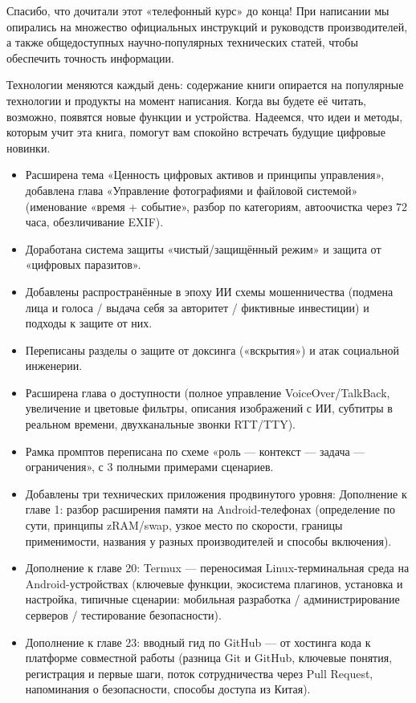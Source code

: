 
Спасибо, что дочитали этот «телефонный курс» до конца! При написании мы опирались на множество официальных инструкций и руководств производителей, а также общедоступных научно-популярных технических статей, чтобы обеспечить точность информации.

Технологии меняются каждый день: содержание книги опирается на популярные технологии и продукты на момент написания. Когда вы будете её читать, возможно, появятся новые функции и устройства. Надеемся, что идеи и методы, которым учит эта книга, помогут вам спокойно встречать будущие цифровые новинки.


\begin{itemize}
  \item Расширена тема «Ценность цифровых активов и принципы управления», добавлена глава «Управление фотографиями и файловой системой» (именование «время + событие», разбор по категориям, автоочистка через 72 часа, обезличивание EXIF).
  \item Доработана система защиты «чистый/защищённый режим» и защита от «цифровых паразитов».
  \item Добавлены распространённые в эпоху ИИ схемы мошенничества (подмена лица и голоса / выдача себя за авторитет / фиктивные инвестиции) и подходы к защите от них.
  \item Переписаны разделы о защите от доксинга («вскрытия») и атак социальной инженерии.
  \item Расширена глава о доступности (полное управление VoiceOver/TalkBack, увеличение и цветовые фильтры, описания изображений с ИИ, субтитры в реальном времени, двухканальные звонки RTT/TTY).
  \item Рамка промптов переписана по схеме «роль — контекст — задача — ограничения», с 3 полными примерами сценариев.
  \item Добавлены три технических приложения продвинутого уровня: Дополнение к главе 1: разбор расширения памяти на Android-телефонах (определение по сути, принципы zRAM/swap, узкое место по скорости, границы применимости, названия у разных производителей и способы включения).
  \item Дополнение к главе 20: Termux — переносимая Linux-терминальная среда на Android-устройствах (ключевые функции, экосистема плагинов, установка и настройка, типичные сценарии: мобильная разработка / администрирование серверов / тестирование безопасности).
  \item Дополнение к главе 23: вводный гид по GitHub — от хостинга кода к платформе совместной работы (разница Git и GitHub, ключевые понятия, регистрация и первые шаги, поток сотрудничества через Pull Request, напоминания о безопасности, способы доступа из Китая).
\end{itemize}

